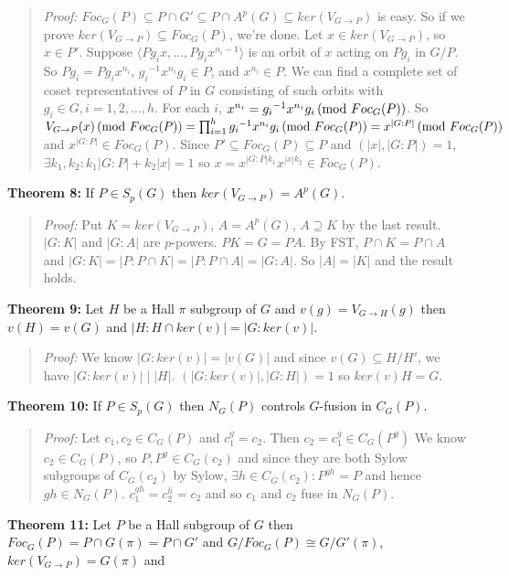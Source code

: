 \begin{quote}
\emph{Proof:}  
$Foc_G(P) \subseteq  P \cap G' \subseteq  P \cap A^p(G)  \subseteq ker(V_{G \rightarrow P})$ is
easy.  So if we prove
$ker(V_{G \rightarrow P}) \subseteq Foc_G(P)$, we're done.  Let $x \in ker(V_{G \rightarrow P})$, so $x \in P'$.
Suppose $\langle Pg_i x, \ldots , P g_i x^{n_i - 1} \rangle$ is an orbit of $x$ acting on $Pg_i$ in $G/P$. So $Pg_i = Pg_i x^{n_i}$,
${g_i}^{-1} x^{n_i} g_i \in P$, and $x^{n_i} \in P$.  
We can find a complete set of coset representatives of $P$ in $G$ consisting of such orbits with $g_i \in G, i = 1,2, \ldots, h$.
For each $i$, $x^{n_i} = {g_i}^{-1} x^{n_i} g_i \thinspace \textnormal{(mod } Foc_G(P) \textnormal{)}$.  So 
$V_{G \rightarrow P}(x) \thinspace \textnormal{(mod } Foc_G(P) \textnormal{)} = \prod_{i=1}^h {g_i}^{-1} x^{n_i} g_i \thinspace \textnormal{(mod } Foc_G(P) \textnormal{)} = x^{|G:P|} \thinspace \textnormal{(mod } Foc_G(P) \textnormal{)}$
and  $x^{|G:P|} \in Foc_G(P)$.  Since $P' \subseteq Foc_G(P) \subseteq P$ and $(|x|, |G:P|) =1$, $\exists k_1, k_2: k_1|G:P| + k_2|x| = 1$
so $x = x^{|G:P| k_1} x^{|x| k_2} \in Foc_G(P)$.
\end{quote}
{\bf Theorem 8:}  
If $P \in S_p(G)$ then $ker(V_{G \rightarrow P})= A^p(G)$.
\begin{quote}
\emph{Proof:}  
Put $K= ker(V_{G \rightarrow P})$, $A= A^p(G)$,  $A \supseteq K$ by the last result.
$|G:K|$ and $|G:A|$ are $p$-powers.  $PK=G=PA$.  By FST, $P \cap K = P \cap A$ and
$|G:K|= |P:P \cap K|= |P: P \cap A|= |G:A|$.  So $|A|= |K|$ and the result holds.
\end{quote}
{\bf Theorem 9:}  
Let $H$ be a Hall $\pi$ subgroup of $G$ and $v(g)= V_{G \rightarrow H}(g)$ then
$v(H)=v(G)$ and $|H: H \cap ker(v)|= |G:ker(v)|$.
\begin{quote}
\emph{Proof:}  
We know $|G:ker(v)| = |v(G)|$ and since
$v(G) \subseteq H/H'$, we have $|G:ker(v)| \mid |H|$.  $(|G:ker(v)|, |G:H|)=1$ so
$ker(v)H=G$.
\end{quote}
{\bf Theorem 10:}  
If $P \in S_p(G)$ then $N_G(P)$ controls $G$-fusion in $C_G(P)$.
\begin{quote}
\emph{Proof:}  
Let $c_1 , c_2 \in C_G(P)$ and $c_1^g=c_2$.  Then $c_2 = c_1^g \in C_G(P^g)$
We know $c_2 \in C_G(P)$, so $P, P^g \in C_G(c_2)$ and since they are both
Sylow subgroups of $C_G(c_2)$ by Sylow, $\exists h \in C_G(c_2): P^{gh}=P$ and
hence $gh \in N_G(P)$.  $c_1^{gh}= c_2^h= c_2$ and so $c_1$ and $c_2$ fuse in $N_G(P)$.
\end{quote}
{\bf Theorem 11:}  Let  $P$ be a Hall subgroup of $G$ then $Foc_G(P) = P \cap G(\pi)=P \cap G'$ and
$G/Foc_G(P) \cong G/G'(\pi)$, $ker(V_{G \rightarrow P}) = G(\pi)$ and
